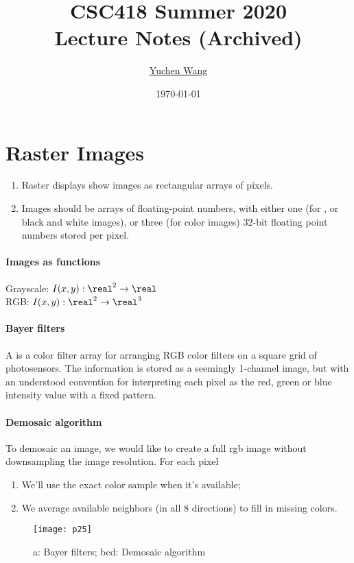 \documentclass[11pt]{article}
\title{CSC418 Summer 2020\\ Lecture Notes (Archived)}
\author{\textcolor{blue}{\href{https://www.yuchenwyc.com}{Yuchen Wang}}}
\date{\today}
\numberwithin{equation}{section}
\begin{document}
    \maketitle
    \tableofcontents
    \newpage
\section{Raster Images}
\begin{enumerate}
	\item Raster displays show images as rectangular arrays of pixels.
	\item Images should be arrays of floating-point numbers, with either one (for , or black and white images), or three (for  color images) 32-bit floating point numbers stored per pixel.
\end{enumerate}

\paragraph{Images as functions}
Grayscale: $I(x, y): \real^2 \rightarrow \real$\\
RGB: $I(x, y): \real^2 \rightarrow \real^3$\\



\paragraph{Bayer filters}
A  is a color filter array for arranging RGB color filters on a square grid of photosensors. The information is stored as a seemingly 1-channel image, but with an understood convention for interpreting each pixel as the red, green or blue intensity value with a fixed pattern.
\paragraph{Demosaic algorithm}
To demosaic an image, we would like to create a full rgb image without downsampling the image resolution. For each pixel
\begin{enumerate}
	\item We'll use the exact color sample when it's available;
	\item We average available neighbors (in all 8 directions) to fill in missing colors.
\end{enumerate}

	\begin{figure}[H]
	\centering
	\texttt{[image: p25]}
	\caption{a: Bayer filters; bcd: Demosaic algorithm}
	\end{figure}
\end{document}
